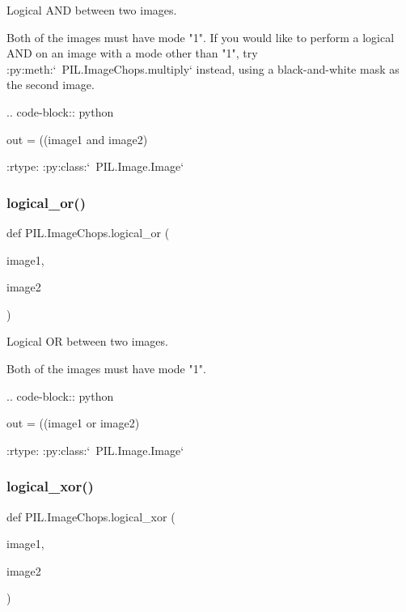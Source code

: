 \begin{DoxyVerb}Logical AND between two images.

Both of the images must have mode "1". If you would like to perform a
logical AND on an image with a mode other than "1", try
:py:meth:`~PIL.ImageChops.multiply` instead, using a black-and-white mask
as the second image.

.. code-block:: python

    out = ((image1 and image2) %

:rtype: :py:class:`~PIL.Image.Image`
\end{DoxyVerb}
 \mbox{\label{namespacePIL_1_1ImageChops_a4be1980482ad2366e9b55da5409e418e}} 
\subsubsection{\texorpdfstring{logical\+\_\+or()}{logical\_or()}}
{\footnotesize\ttfamily def P\+I\+L.\+Image\+Chops.\+logical\+\_\+or (\begin{DoxyParamCaption}\item[{}]{image1,  }\item[{}]{image2 }\end{DoxyParamCaption})}

\begin{DoxyVerb}Logical OR between two images.

Both of the images must have mode "1".

.. code-block:: python

    out = ((image1 or image2) %

:rtype: :py:class:`~PIL.Image.Image`
\end{DoxyVerb}
 \mbox{\label{namespacePIL_1_1ImageChops_a67f21948c21172e1086590a0932ce160}} 
\subsubsection{\texorpdfstring{logical\+\_\+xor()}{logical\_xor()}}
{\footnotesize\ttfamily def P\+I\+L.\+Image\+Chops.\+logical\+\_\+xor (\begin{DoxyParamCaption}\item[{}]{image1,  }\item[{}]{image2 }\end{DoxyParamCaption})}

